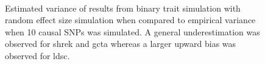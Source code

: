 \documentclass[12pt]{scrbook}
\begin{document}
\begin{figure}
{		\label{fig:gctaCC10RandVarCom}
	}\\
	\caption[Estimation of Variance in Binary Trait Simulation (10 Causal)]
	{Estimated variance of results from binary trait simulation with random effect size simulation when compared to empirical variance when 10 causal \glspl{SNP} was simulated.
		A general underestimation was observed for \gls{shrek} and \gls{gcta} whereas a larger upward bias was observed for \gls{ldsc}.} 
	\label{fig:CC10RandVarCom}
\end{figure}
\end{document}
